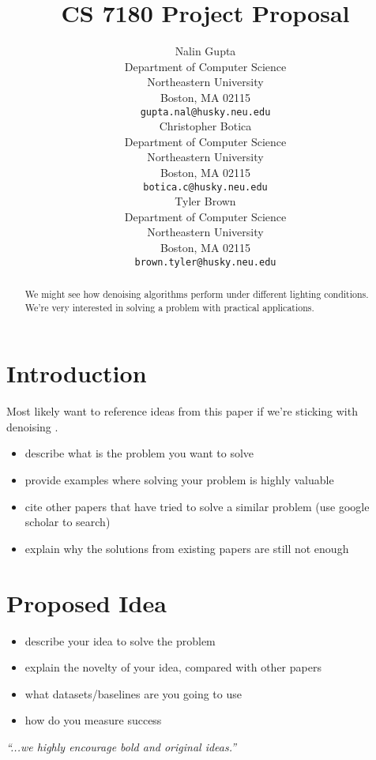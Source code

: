 \documentclass{article}
\title{CS 7180 Project Proposal}
\author{%
  Nalin Gupta \\
  Department of Computer Science\\
  Northeastern University\\
  Boston, MA 02115 \\
  \texttt{gupta.nal@husky.neu.edu} \\
  \And
  Christopher Botica\\
  Department of Computer Science\\
  Northeastern University\\
  Boston, MA 02115 \\
  \texttt{botica.c@husky.neu.edu} \\
  \And
  Tyler Brown\\
  Department of Computer Science\\
  Northeastern University\\
  Boston, MA 02115 \\
  \texttt{brown.tyler@husky.neu.edu} \\
}
\begin{document}

\maketitle

\begin{abstract}
  We might see how denoising algorithms perform under different lighting
  conditions. We're very interested in solving a problem with practical
  applications. 
\end{abstract}

\section{Introduction}

Most likely want to reference ideas from this paper if we're
sticking with denoising \cite{tian2018deep}.

\begin{itemize}
  \item describe what is the problem you want to solve
  \item provide examples where solving your problem is highly valuable 
  \item cite other papers that have tried to solve a similar problem
    (use google scholar to search)
  \item explain why the solutions from existing papers are still not enough
\end{itemize}

\section{Proposed Idea}

\begin{itemize}
\item describe your idea to solve the problem
\item explain the novelty of your idea, compared with other papers
\item what datasets/baselines are you going to use
\item how do you measure success
\end{itemize}

\textit{``...we highly encourage bold and original ideas.''}




\end{document}
